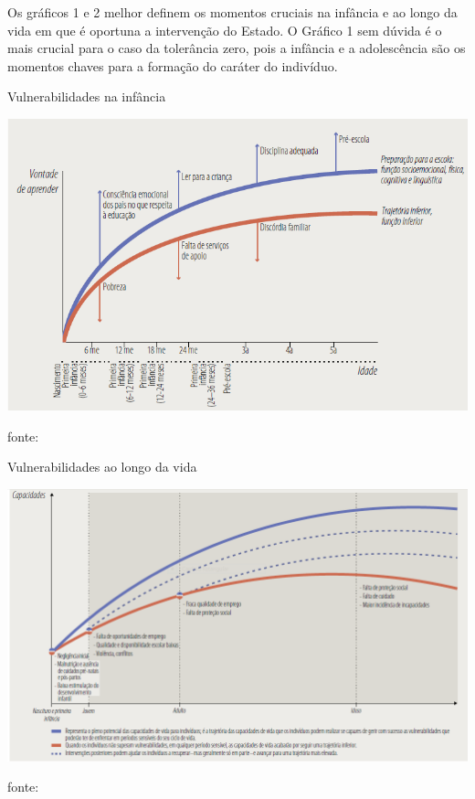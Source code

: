 \documentclass[
	12pt,				%
	openright,			%
	twoside,			%
	a4paper,			%
	chapter=TITLE,		%
	section=TITLE,		%
	subsection=TITLE,	%
	subsubsection=TITLE,%
	spanish,            %
	english,			%
	brazil				%
	]{abntex2}
\begin{document}
\par
Os gráficos 1 e 2 melhor definem os
momentos cruciais na infância e ao longo da vida em que é oportuna a intervenção do Estado. O Gráfico 1 sem dúvida é o mais crucial para o caso da tolerância zero, pois a infância e a adolescência são os momentos chaves para a formação do caráter do indivíduo.
\begin{grafico}[h]
	\begin{center}
		\caption{Vulnerabilidades na infância}
		\includegraphics[scale=0.70]{criancap93.png}
	\end{center}
	\ABNTEXchapterfont\small{fonte:\cite[p. ~93]{PNUD2014}}
	\label{Criança}
\end{grafico}
\FloatBarrier
\begin{grafico}[h]
	\begin{center}
		\caption{Vulnerabilidades ao longo da vida}
		\includegraphics[scale=0.55]{Adultop57.png}
	\end{center}
	\ABNTEXchapterfont\small{fonte:\cite[p. ~57]{PNUD2014}}
	\label{Adulto}
\end{grafico} 
\end{document}
